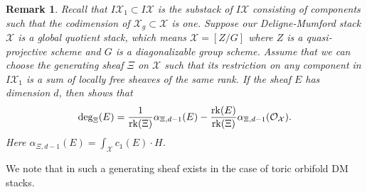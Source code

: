 \documentclass[10pt]{amsart}
\newtheorem{thm}[prop]{Theorem}
\newtheorem{rmk}[prop]{Remark}
\newcommand{\sO}{{\mathcal O}}
\newcommand{\sX}{{\mathcal X}}
\newcommand{\rk}{\mathop{\rm rk}}
\numberwithin{equation}{subsection}
\begin{document}
\begin{rmk}\label{rmk_stability_quotient}
Recall that  $I\sX_1\subset I\sX$ is the substack of $I\sX$ consisting of components such that the codimension of $\sX_g\subset \sX$  is one. 
Suppose our Deligne-Mumford stack $\sX$ is a global quotient stack, which means $\sX=[Z/G]$ where $Z$ is a quasi-projective scheme and $G$ is a diagonalizable group scheme. Assume that we can choose the generating sheaf $\Xi$ on $\sX$ such that its restriction on any component in $I\sX_1$ is a sum of  locally free sheaves of  the same rank. If the sheaf $E$ has dimension $d$, then    \cite[Proposition 3.18]{Nir} shows that 
$$\deg_{\Xi}(E)=\frac{1}{\rk(\Xi)}\alpha_{\Xi, d-1}(E)-\frac{\rk(E)}{\rk(\Xi)}\alpha_{\Xi,d-1}(\sO_{\sX}).$$
Here $\alpha_{\Xi, d-1}(E)=\int_{\sX}c_1(E)\cdot H$. 
\end{rmk}



We note that in \cite[Proposition 2.3]{Nir} such a generating sheaf exists in the case of toric orbifold DM stacks.
\end{document}
